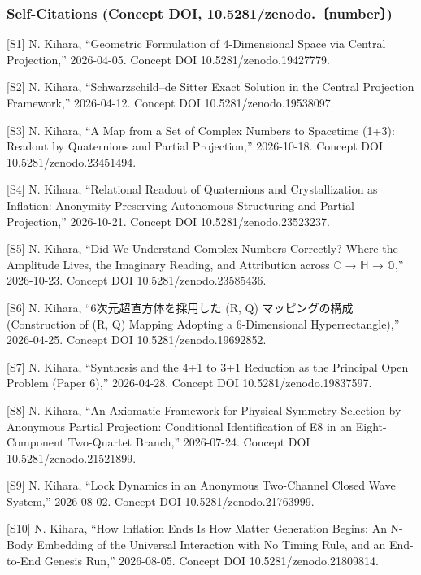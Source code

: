 \documentclass[
  a4paper,
]{article}
\begin{document}
\subsubsection{Self-Citations (Concept DOI,
10.5281/zenodo.〔number〕)}\label{self-citations-concept-doi-10.5281zenodo.number}

{[}S1{]} N. Kihara, ``Geometric Formulation of 4-Dimensional Space via
Central Projection,'' 2026-04-05. Concept DOI 10.5281/zenodo.19427779.

{[}S2{]} N. Kihara, ``Schwarzschild--de Sitter Exact Solution in the
Central Projection Framework,'' 2026-04-12. Concept DOI
10.5281/zenodo.19538097.

{[}S3{]} N. Kihara, ``A Map from a Set of Complex Numbers to Spacetime
(1+3): Readout by Quaternions and Partial Projection,'' 2026-10-18.
Concept DOI 10.5281/zenodo.23451494.

{[}S4{]} N. Kihara, ``Relational Readout of Quaternions and
Crystallization as Inflation: Anonymity-Preserving Autonomous
Structuring and Partial Projection,'' 2026-10-21. Concept DOI
10.5281/zenodo.23523237.

{[}S5{]} N. Kihara, ``Did We Understand Complex Numbers Correctly? Where
the Amplitude Lives, the Imaginary Reading, and Attribution across
\(\mathbb{C}\) → \(\mathbb{H}\) → \(\mathbb{O}\),'' 2026-10-23. Concept
DOI 10.5281/zenodo.23585436.

{[}S6{]} N. Kihara, ``6次元超直方体を採用した (R, Q) マッピングの構成
(Construction of (R, Q) Mapping Adopting a 6-Dimensional
Hyperrectangle),'' 2026-04-25. Concept DOI 10.5281/zenodo.19692852.

{[}S7{]} N. Kihara, ``Synthesis and the 4+1 to 3+1 Reduction as the
Principal Open Problem (Paper 6),'' 2026-04-28. Concept DOI
10.5281/zenodo.19837597.

{[}S8{]} N. Kihara, ``An Axiomatic Framework for Physical Symmetry
Selection by Anonymous Partial Projection: Conditional Identification of
E8 in an Eight-Component Two-Quartet Branch,'' 2026-07-24. Concept DOI
10.5281/zenodo.21521899.

{[}S9{]} N. Kihara, ``Lock Dynamics in an Anonymous Two-Channel Closed
Wave System,'' 2026-08-02. Concept DOI 10.5281/zenodo.21763999.

{[}S10{]} N. Kihara, ``How Inflation Ends Is How Matter Generation
Begins: An N-Body Embedding of the Universal Interaction with No Timing
Rule, and an End-to-End Genesis Run,'' 2026-08-05. Concept DOI
10.5281/zenodo.21809814.
\end{document}
